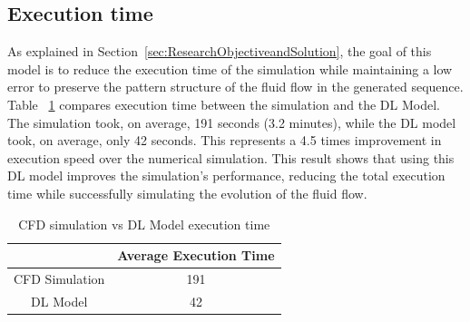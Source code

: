 \subsection{Execution time}
\label{subsec:ExecutionTime}
As explained in Section~\ref{sec:ResearchObjectiveandSolution}, the goal of this model is to reduce the execution time of the simulation while maintaining a low error to preserve the pattern structure of the fluid flow in the generated sequence. Table~ \ref{tab:ExecutionTime} compares execution time between the simulation and the DL Model. The simulation took, on average, 191 seconds (3.2 minutes), while the DL model took, on average, only 42 seconds. This represents a 4.5 times improvement in execution speed over the numerical simulation. This result shows that using this DL model improves the simulation's performance, reducing the total execution time while successfully simulating the evolution of the fluid flow. 




\begin{table}[ht]
    \caption{CFD simulation vs DL Model execution time}
    \centering
    \begin{tabular}{|c|c|}
    \hline
                    & Average Execution Time \\ \hline
    CFD Simulation  & 191 \\ \hline
    DL Model        & 42 \\ \hline
    \end{tabular}
    \label{tab:ExecutionTime}
\end{table}

